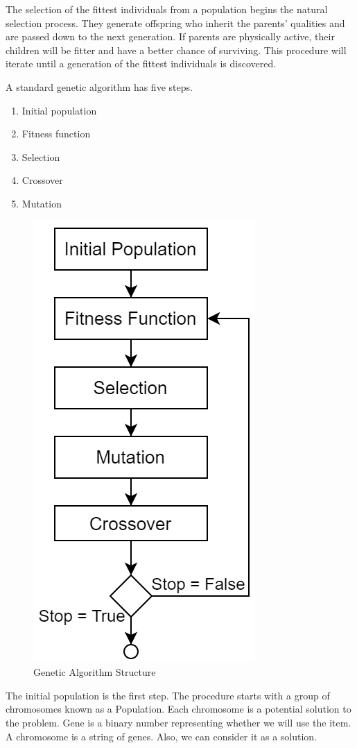 \documentclass[sigconf]{acmart}
\begin{document}
The selection of the fittest individuals from a population begins the natural selection process. They generate offspring who inherit the parents' qualities and are passed down to the next generation. If parents are physically active, their children will be fitter and have a better chance of surviving. This procedure will iterate until a generation of the fittest individuals is discovered. 

A standard genetic algorithm has five steps.
\begin{enumerate}
  	\item Initial population
  	\item Fitness function
  	\item Selection
	\item Crossover
	\item Mutation
\end{enumerate}

\begin{figure}
\includegraphics[scale=0.5]{GA Structure}
\caption{Genetic Algorithm Structure}
\end{figure}
The initial population is the first step. The procedure starts with a group of chromosomes known as a Population. Each chromosome is a potential solution to the problem. Gene is a binary number representing whether we will use the item. A chromosome is a string of genes. Also, we can consider it as a solution. 
\end{document}
